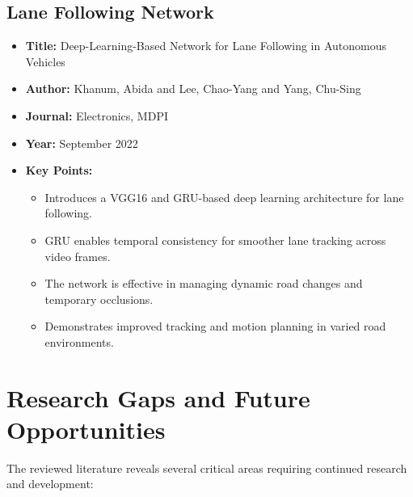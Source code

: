 \subsection{Lane Following Network}
\begin{itemize}
    \item \textbf{Title:} Deep-Learning-Based Network for Lane Following in Autonomous Vehicles \cite{khanum2022deep}
    \item \textbf{Author:} Khanum, Abida and Lee, Chao-Yang and Yang, Chu-Sing
    \item \textbf{Journal:} Electronics, MDPI
    \item \textbf{Year:} September 2022
    \item \textbf{Key Points:}
    \begin{itemize}
        \item Introduces a VGG16 and GRU-based deep learning architecture for lane following.
        \item GRU enables temporal consistency for smoother lane tracking across video frames.
        \item The network is effective in managing dynamic road changes and temporary occlusions.
        \item Demonstrates improved tracking and motion planning in varied road environments.
    \end{itemize}
\end{itemize}

\section{Research Gaps and Future Opportunities}

The reviewed literature reveals several critical areas requiring continued research and development:

